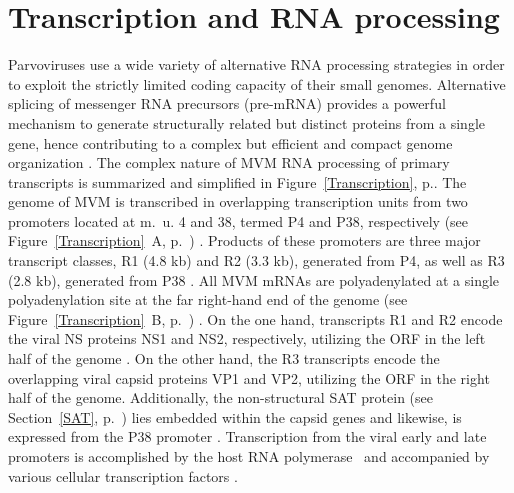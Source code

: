 \section{Transcription and RNA processing}
\label{Transcription1}
Parvoviruses use a wide variety of alternative RNA processing strategies in order to exploit the strictly limited coding capacity of their small genomes. Alternative splicing of messenger RNA precursors (pre-mRNA) provides a powerful mechanism to generate structurally related but distinct proteins from a single gene, hence contributing to a complex but efficient and compact genome organization \cite{pmid2694943, pmid1335742}. The complex nature of MVM RNA processing of primary transcripts is summarized and simplified in Figure~\ref{Transcription}, p.\pageref{Transcription}. The genome of MVM is transcribed in overlapping transcription units from two promoters located at m.~u. 4 and 38, termed P4 and P38, respectively (see Figure~\ref{Transcription}~A, p.~\pageref{Transcription}) \cite{pmid6828378}. Products of these promoters are three major transcript classes, R1 (4.8 kb) and R2 (3.3 kb), generated from P4, as well as R3 (2.8 kb), generated from P38 \cite{pmid3951017}. All MVM mRNAs are polyadenylated at a single polyadenylation site at the far right-hand end of the genome (see Figure~\ref{Transcription}~B, p.~\pageref{Transcription}) \cite{pmid3660591, pmid3502703}. On the one hand, transcripts R1 and R2 encode the viral NS proteins NS1 and NS2, respectively, utilizing the ORF in the left half of the genome \cite{pmid2939261}. On the other hand, the R3 transcripts encode the overlapping viral capsid proteins VP1 and VP2, utilizing the ORF in the right half of the genome. Additionally, the non-structural SAT protein (see Section~\ref{SAT}, p.~\pageref{SAT}) lies embedded within the capsid genes and likewise, is expressed from the P38 promoter \cite{pmid16189014}. Transcription from the viral early and late promoters is accomplished by the host RNA polymerase~ \cite{pmid6828378, polII} and accompanied by various cellular transcription factors \cite{pmid2585609, pmid8009857, pmid2325201, pmid7983715, pmid1942250}. 


